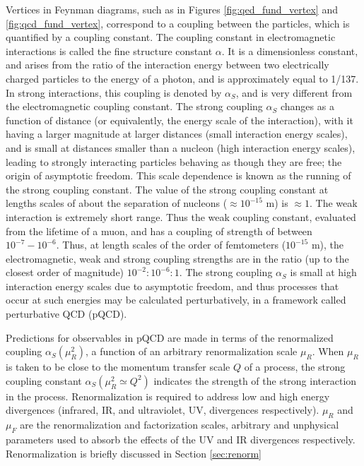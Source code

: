 \documentclass[12pt,a4paper,openright,twoside]{report}
\begin{document}
Vertices in Feynman diagrams, such as in Figures \ref{fig:qed_fund_vertex} and \ref{fig:qcd_fund_vertex}, correspond to a coupling between the particles, which is quantified by a coupling constant. The coupling constant in electromagnetic interactions is called the fine structure constant $\alpha$. It is a dimensionless constant, and arises from the ratio of the interaction energy between two electrically charged particles to the energy of a photon, and is approximately equal to 1/137. In strong interactions, this coupling is denoted by $\alpha_{S}$, and is very different from the electromagnetic coupling constant. The strong coupling $\alpha_{S}$ changes as a function of distance (or equivalently, the energy scale of the interaction), with it having a larger magnitude at larger distances (small interaction energy scales), and is small at distances smaller than a nucleon (high interaction energy scales), leading to strongly interacting particles behaving as though they are free; the origin of asymptotic freedom. This scale dependence is known as the running of the strong coupling constant. The value of the strong coupling constant at lengths scales of about the separation of nucleons ($\approx 10^{-15}$ m) is $\approx 1$. The weak interaction is extremely short range. Thus the weak coupling constant, evaluated from the lifetime of a muon, and has a coupling of strength of between $10^{-7}-10^{-6}$. Thus, at length scales of the order of femtometers ($10^{-15}$ m), the electromagnetic, weak and strong coupling strengths are in the ratio (up to the closest order of magnitude) $10^{-2}:10^{-6}:1$. The strong coupling $\alpha_S$ is small at high interaction energy scales due to asymptotic freedom, and thus processes that occur at such energies may be calculated perturbatively, in a framework called perturbative QCD (pQCD).

Predictions for observables in pQCD are made in terms of the renormalized coupling $\alpha_S(\mu_R^2)$, a function of an arbitrary renormalization scale $\mu_R$. When $\mu_R$ is taken to be close to the momentum transfer scale $Q$ of a process, the strong coupling constant $\alpha_S(\mu_R^2 \simeq Q^2)$ indicates the strength of the strong interaction in the process. Renormalization is required to address low and high energy divergences (infrared, IR, and ultraviolet, UV, divergences respectively). $\mu_R$ and $\mu_F$ are the renormalization and factorization scales, arbitrary and unphysical parameters used to absorb the effects of the UV and IR divergences respectively. Renormalization is briefly discussed in Section \ref{sec:renorm}
\end{document}
